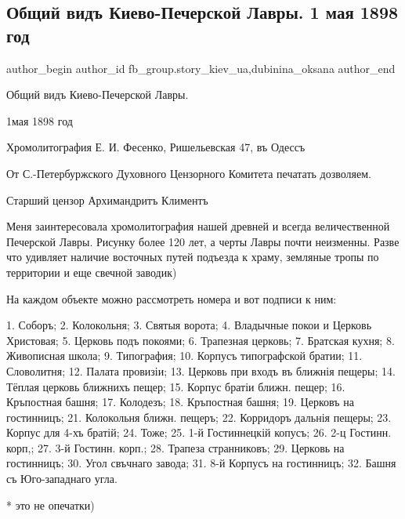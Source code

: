  
 
 
 
 
 
\subsection{Общий видъ Киево-Печерской Лавры. 1 мая 1898 год}
\label{sec:21_10_2021.fb.fb_group.story_kiev_ua.1.lavra_1898_hromolitografia}
 
\ifcmt
 author_begin
   author_id fb_group.story_kiev_ua,dubinina_oksana
 author_end
\fi

Общий видъ Киево-Печерской Лавры. 

1мая 1898 год

Хромолитография Е. И. Фесенко, Ришельевская 47, въ Одессъ

От С.-Петербуржского Духовного Цензорного Комитета печатать дозволяем.

Старший цензор Архимандритъ Климентъ 

Меня заинтересовала хромолитография нашей древней и всегда величественной
Печерской Лавры. Рисунку более 120 лет, а черты Лавры почти неизменны. Разве
что удивляет наличие восточных путей подъезда к храму, земляные тропы по
территории  и еще свечной заводик)


На каждом объекте можно рассмотреть номера и вот подписи к ним:

1. Соборъ; 2. Колокольня; 3. Святыя ворота; 4. Владычные покои и Церковь
Христовая; 5. Церковь подъ покоями; 6. Трапезная церковь; 7. Братская кухня; 8.
Живописная школа; 9. Типография; 10. Корпусъ типографской братии; 11.
Словолитня; 12. Палата провизіи; 13. Церковь при входъ въ ближнія пещеры; 14.
Тёплая церковь ближнихъ пещер; 15. Корпус братіи ближн. пещер; 16. Кръпостная
башня; 17. Колодезъ; 18. Кръпостная башня; 19. Церковъ на гостинницъ; 21.
Колокольня ближн. пещеръ; 22. Корридоръ дальнія пещеры; 23. Корпус для 4-хъ
братій; 24. Тоже; 25. 1-й Гостиннецкій копусъ; 26. 2-ц Гостинн. корп,; 27. 3-й
Гостинн. корп.; 28. Трапеза странниковъ; 29. Церковь на гостинницъ; 30. Угол
свъчнаго завода; 31. 8-й Корпусъ на гостинницъ; 32. Башня съ Юго-западнаго
угла.

* это не опечатки)

